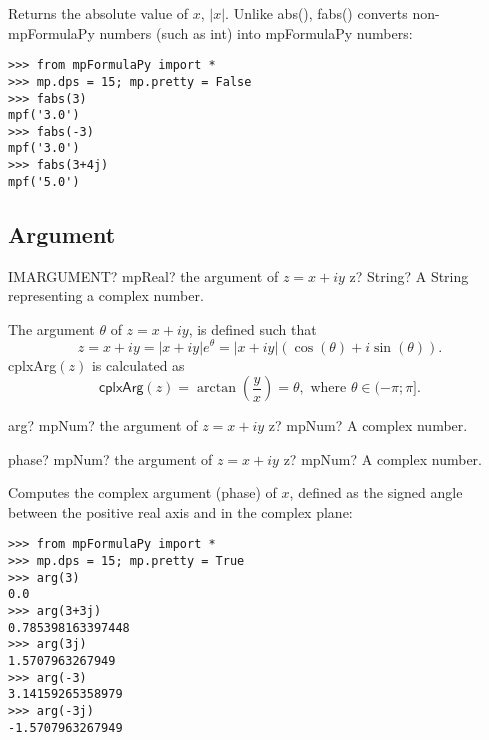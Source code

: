 \vpara
Returns the absolute value of $x$, $|x|$. Unlike abs(), fabs() converts non-mpFormulaPy numbers (such as int) into mpFormulaPy numbers:

\begin{lstlisting}
>>> from mpFormulaPy import *
>>> mp.dps = 15; mp.pretty = False
>>> fabs(3)
mpf('3.0')
>>> fabs(-3)
mpf('3.0')
>>> fabs(3+4j)
mpf('5.0')
\end{lstlisting}

\subsection{Argument}

\begin{mpFunctionsExtract}
	\mpWorksheetFunctionOneNotImplemented
	{IMARGUMENT? mpReal? the argument of $z=x+iy$}
	{z? String? A String representing a complex number.}
\end{mpFunctionsExtract}

\vspace{0.3cm}
The argument $\theta$ of $z=x+iy$, is defined such that
\begin{equation}
z=x+iy = |x+iy|e^{\theta} = |x+iy|(\cos(\theta)+ i \sin(\theta)).
\end{equation}
\textsf{cplxArg$(z)$} is calculated as
\begin{equation}
\textsf{cplxArg$(z)$}  = \arctan\left(\frac{y}{x} \right) = \theta, \text{ where } \theta \in (-\pi;\pi].
\end{equation}

\vspace{0.6cm}

\begin{mpFunctionsExtract}
	\mpFunctionOne
	{arg? mpNum? the argument of $z=x+iy$}
	{z? mpNum? A complex number.}
\end{mpFunctionsExtract}

\vspace{0.6cm}

\begin{mpFunctionsExtract}
	\mpFunctionOne
	{phase? mpNum? the argument of $z=x+iy$}
	{z? mpNum? A complex number.}
\end{mpFunctionsExtract}


\vpara
Computes the complex argument (phase) of $x$, defined as the signed angle between the positive real axis and in the complex plane:

\begin{lstlisting}
>>> from mpFormulaPy import *
>>> mp.dps = 15; mp.pretty = True
>>> arg(3)
0.0
>>> arg(3+3j)
0.785398163397448
>>> arg(3j)
1.5707963267949
>>> arg(-3)
3.14159265358979
>>> arg(-3j)
-1.5707963267949
\end{lstlisting}



